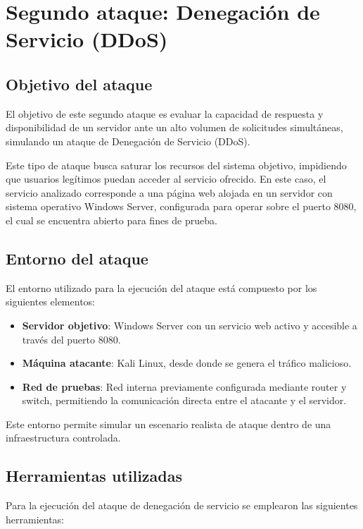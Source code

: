 \section{Segundo ataque: Denegación de Servicio (DDoS)}

\subsection{Objetivo del ataque}

El objetivo de este segundo ataque es evaluar la capacidad de respuesta y disponibilidad de un servidor ante un alto volumen de solicitudes simultáneas, simulando un ataque de Denegación de Servicio (DDoS).

Este tipo de ataque busca saturar los recursos del sistema objetivo, impidiendo que usuarios legítimos puedan acceder al servicio ofrecido. En este caso, el servicio analizado corresponde a una página web alojada en un servidor con sistema operativo Windows Server, configurada para operar sobre el puerto 8080, el cual se encuentra abierto para fines de prueba.

\subsection{Entorno del ataque}

El entorno utilizado para la ejecución del ataque está compuesto por los siguientes elementos:

\begin{itemize}
    \item \textbf{Servidor objetivo}: Windows Server con un servicio web activo y accesible a través del puerto 8080.
    \item \textbf{Máquina atacante}: Kali Linux, desde donde se genera el tráfico malicioso.
    \item \textbf{Red de pruebas}: Red interna previamente configurada mediante router y switch, permitiendo la comunicación directa entre el atacante y el servidor.
\end{itemize}

Este entorno permite simular un escenario realista de ataque dentro de una infraestructura controlada.

\subsection{Herramientas utilizadas}

Para la ejecución del ataque de denegación de servicio se emplearon las siguientes herramientas:

